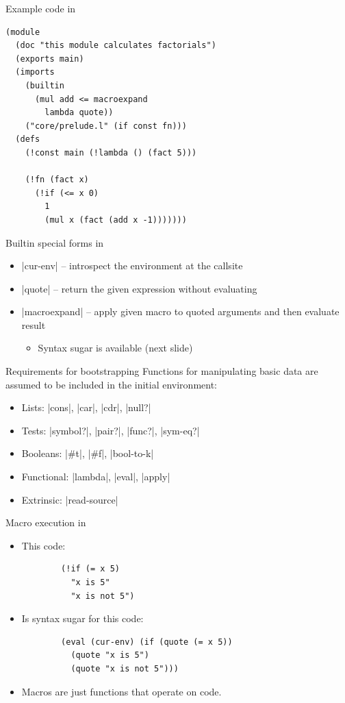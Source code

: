 \begin{frame}[fragile]{Example code in \lang}
\begin{verbatim}
(module
  (doc "this module calculates factorials")
  (exports main)
  (imports
    (builtin
      (mul add <= macroexpand
        lambda quote))
    ("core/prelude.l" (if const fn)))
  (defs
    (!const main (!lambda () (fact 5)))

    (!fn (fact x)
      (!if (<= x 0)
        1
        (mul x (fact (add x -1)))))))
\end{verbatim}
\end{frame}

\begin{frame}[fragile]{Builtin special forms in \lang}
\begin{itemize}
  \item \linline|cur-env| -- introspect the environment at the callsite
  \item \linline|quote| -- return the given expression without evaluating
  \item \linline|macroexpand| -- apply given macro to quoted arguments and then evaluate result
  \begin{itemize}
    \item Syntax sugar is available (next slide)
  \end{itemize}
\end{itemize}
\end{frame}

\begin{frame}[fragile]{Requirements for bootstrapping}
Functions for manipulating basic data are assumed to be included in the initial environment:
\begin{itemize}
\item Lists: \linline|cons|, \linline|car|, \linline|cdr|, \linline|null?|
\item Tests: \linline|symbol?|, \linline|pair?|, \linline|func?|, \linline|sym-eq?|
\item Booleans: \tinline|#t|, \tinline|#f|, \linline|bool-to-k|
\item Functional: \linline|lambda|, \linline|eval|, \linline|apply|
\item Extrinsic: \linline|read-source|
\end{itemize}
\end{frame}

\begin{frame}[fragile]{Macro execution in \lang}
\begin{itemize}
    \item This code:
      \begin{verbatim}
        (!if (= x 5)
          "x is 5"
          "x is not 5")
      \end{verbatim}
    \item Is syntax sugar for this code:
      \begin{verbatim}
        (eval (cur-env) (if (quote (= x 5))
          (quote "x is 5")
          (quote "x is not 5")))
      \end{verbatim}
    \item Macros are just functions that operate on code.
\end{itemize}
\end{frame}

